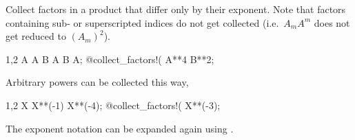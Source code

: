 
Collect factors in a product that differ only by their exponent. Note
that factors containing sub- or superscripted indices do not get
collected (i.e.~$A_m A^m$ does not get reduced to $(A_m)^2$).
\begin{screen}{1,2}
A A B A B A;
@collect_factors!(%
A**4 B**2;
\end{screen}
Arbitrary powers can be collected this way,
\begin{screen}{1,2}
X X**(-1) X**(-4);
@collect_factors!(%
X**(-3);
\end{screen}
The exponent notation can be expanded again 
using .

~

